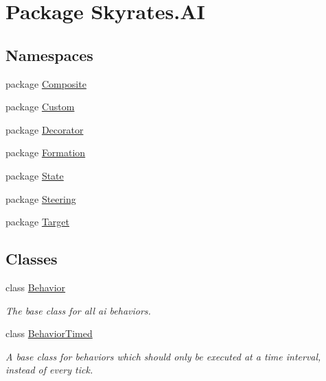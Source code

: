 \hypertarget{namespace_skyrates_1_1_a_i}{\section{Package Skyrates.\-A\-I}
\label{namespace_skyrates_1_1_a_i}
}
\subsection*{Namespaces}
\begin{DoxyCompactItemize}
\item 
package \hyperlink{namespace_skyrates_1_1_a_i_1_1_composite}{Composite}
\item 
package \hyperlink{namespace_skyrates_1_1_a_i_1_1_custom}{Custom}
\item 
package \hyperlink{namespace_skyrates_1_1_a_i_1_1_decorator}{Decorator}
\item 
package \hyperlink{namespace_skyrates_1_1_a_i_1_1_formation}{Formation}
\item 
package \hyperlink{namespace_skyrates_1_1_a_i_1_1_state}{State}
\item 
package \hyperlink{namespace_skyrates_1_1_a_i_1_1_steering}{Steering}
\item 
package \hyperlink{namespace_skyrates_1_1_a_i_1_1_target}{Target}
\end{DoxyCompactItemize}
\subsection*{Classes}
\begin{DoxyCompactItemize}
\item 
class \hyperlink{class_skyrates_1_1_a_i_1_1_behavior}{Behavior}
\begin{DoxyCompactList}\small\item\em The base class for all ai behaviors. \end{DoxyCompactList}\item 
class \hyperlink{class_skyrates_1_1_a_i_1_1_behavior_timed}{Behavior\-Timed}
\begin{DoxyCompactList}\small\item\em A base class for behaviors which should only be executed at a time interval, instead of every tick. \end{DoxyCompactList}\end{DoxyCompactItemize}
